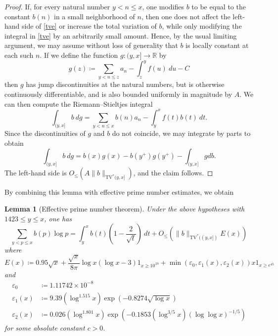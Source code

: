 \documentclass[12pt,a4paper,reqno]{amsart}
\numberwithin{equation}{section}
\theoremstyle{plain}
\newtheorem{lemma}[theorem]{Lemma}
\theoremstyle{definition}
\newcommand\R{\mathbb{R}}
\newcommand\eps{\varepsilon}
\begin{document}
\begin{proof}  If, for every natural number $y < n \leq x$, one modifies $b$ to be equal to the constant $b(n)$ in a small neighborhood of $n$, then one does not affect the left-hand side of \eqref{tve} or increase the total variation of $b$, while only modifying the integral in \eqref{tve} by an arbitrarily small amount.  Hence, by the usual limiting argument, we may assume without loss of generality that $b$ is locally constant at each such $n$.  If we define the function $g \colon (y,x] \to \R$ by
$$ g(z) \coloneqq  \sum_{y < n \leq z} a_n - \int_z^y f(u)\ du - C$$
then $g$ has jump discontinuities at the natural numbers, but is otherwise continuously differentiable, and is also bounded uniformly in magnitude by $A$.  We can then compute the Riemann--Stieltjes integral
$$ \int_{(y,x]} b\ dg = \sum_{y < n \leq x} b(n) a_n - \int_y^x f(t) b(t)\ dt.$$
Since the discontinuities of $g$ and $b$ do not coincide, we may integrate by parts to obtain
$$ \int_{(y,x]} b\ dg = b(x) g(x) - b(y^+) g(y^+) - \int_{(y,x]} g db.$$
The left-hand side is $O_{\leq}(A \|b\|_{\mathrm{TV}^*(y,x]})$, and the claim follows.
\end{proof}

By combining this lemma with effective prime number estimates, we obtain

\begin{lemma}[Effective prime number theorem]\label{buthe}  Under the above hypotheses 
with $1423 \leq y \leq x$, one has
$$  \sum_{y < p \leq x} b(p) \log p = \int_y^x b(t) (1 - \frac{2}{\sqrt{t}}) \ dt
+ O_\leq\left(\|b\|_{\mathrm{TV}^*((y,x])} E(x) \right)$$
where
$$
E(x) \coloneqq 0.95 \sqrt{x} + \frac{\sqrt{x}}{8\pi} \log x(\log x - 3) 1_{x \geq 10^{19}} + \min( \eps_0, \eps_1(x), \eps_2(x)) x 1_{x \geq e^{45}}$$
and
\begin{align*}
  \eps_0 &\coloneqq 1.11742 \times 10^{-8}\\
  \eps_1(x) &\coloneqq 9.39 (\log^{1.515} x) \exp(-0.8274\sqrt{\log x})\\
  \eps_2(x) &\coloneqq 0.026 (\log^{1.801} x) \exp(-0.1853 (\log^{3/5} x) (\log\log x)^{-1/5})
\end{align*}
  for some absolute constant $c>0$.
\end{lemma}
\end{document}
